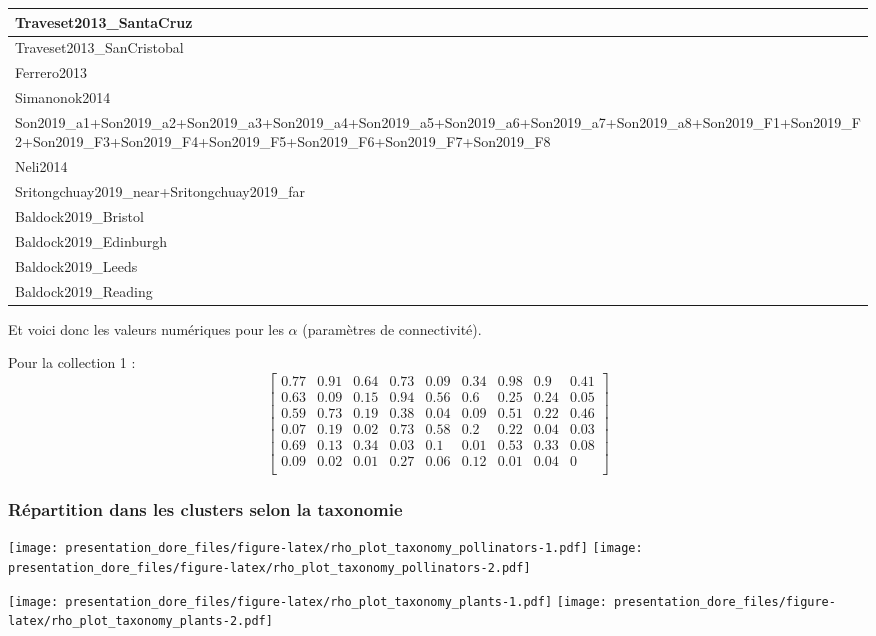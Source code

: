 \documentclass[
]{article}
\begin{document}
\begin{tabular}{l}
\hline
Traveset2013\_SantaCruz\\
\hline
Traveset2013\_SanCristobal\\
\hline
Ferrero2013\\
\hline
Simanonok2014\\
\hline
Son2019\_a1+Son2019\_a2+Son2019\_a3+Son2019\_a4+Son2019\_a5+Son2019\_a6+Son2019\_a7+Son2019\_a8+Son2019\_F1+Son2019\_F2+Son2019\_F3+Son2019\_F4+Son2019\_F5+Son2019\_F6+Son2019\_F7+Son2019\_F8\\
\hline
Neli2014\\
\hline
Sritongchuay2019\_near+Sritongchuay2019\_far\\
\hline
Baldock2019\_Bristol\\
\hline
Baldock2019\_Edinburgh\\
\hline
Baldock2019\_Leeds\\
\hline
Baldock2019\_Reading\\
\hline
\end{tabular}

Et voici donc les valeurs numériques pour les \(\alpha\) (paramètres de
connectivité).

Pour la collection 1 :
\[\begin{bmatrix} 0.77 &0.91 &0.64 &0.73 &0.09 &0.34 &0.98 &0.9 &0.41 \\0.63 &0.09 &0.15 &0.94 &0.56 &0.6 &0.25 &0.24 &0.05 \\0.59 &0.73 &0.19 &0.38 &0.04 &0.09 &0.51 &0.22 &0.46 \\0.07 &0.19 &0.02 &0.73 &0.58 &0.2 &0.22 &0.04 &0.03 \\0.69 &0.13 &0.34 &0.03 &0.1 &0.01 &0.53 &0.33 &0.08 \\0.09 &0.02 &0.01 &0.27 &0.06 &0.12 &0.01 &0.04 &0 \\ \end{bmatrix}\]

\hypertarget{ruxe9partition-dans-les-clusters-selon-la-taxonomie-2}{%
\subsubsection{Répartition dans les clusters selon la
taxonomie}\label{ruxe9partition-dans-les-clusters-selon-la-taxonomie-2}}

\texttt{[image: presentation\_dore\_files/figure-latex/rho\_plot\_taxonomy\_pollinators-1.pdf]}
\texttt{[image: presentation\_dore\_files/figure-latex/rho\_plot\_taxonomy\_pollinators-2.pdf]}

\texttt{[image: presentation\_dore\_files/figure-latex/rho\_plot\_taxonomy\_plants-1.pdf]}
\texttt{[image: presentation\_dore\_files/figure-latex/rho\_plot\_taxonomy\_plants-2.pdf]}
\end{document}
